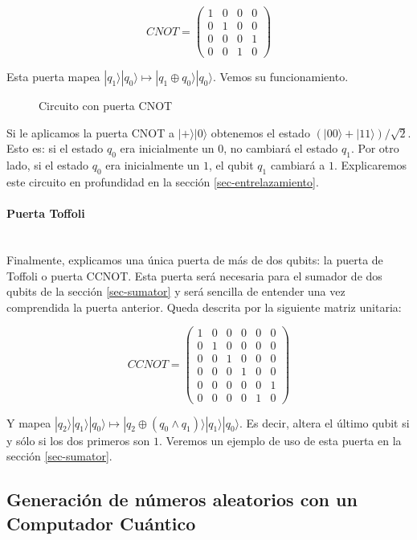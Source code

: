 \documentclass[11pt]{article}
\newcommand{\ra}{\rangle}
\newcommand{\myparagraph}[1]{\paragraph*{#1}\mbox{}\\}
\theoremstyle{plain}
\begin{document}
\[
	CNOT =
	\begin{pmatrix}
	1 & 0 & 0 & 0 \\
	0 & 1 & 0 & 0 \\
	0 & 0 & 0 & 1 \\
	0 & 0 & 1 & 0
	\end{pmatrix}
\]

Esta puerta mapea $|q_1\ra|q_0\ra \mapsto |q_1 \oplus q_0\ra|q_0\ra$. Vemos su funcionamiento.

\begin{figure}[H]
	\centering
	\caption{Circuito con puerta CNOT}
\end{figure}

Si le aplicamos la puerta CNOT a $|+\ra|0\ra$ obtenemos el estado $(|00\ra + |11\ra)/\sqrt 2$. Esto es: si el estado $q_0$ era inicialmente un $0$, no cambiará el estado $q_1$. Por otro lado, si el estado $q_0$ era inicialmente un $1$, el qubit $q_1$ cambiará a $1$. Explicaremos este circuito en profundidad en la sección \ref{sec-entrelazamiento}.


\myparagraph{Puerta Toffoli}


Finalmente, explicamos una única puerta de más de dos qubits: la puerta de Toffoli o puerta CCNOT. Esta puerta será necesaria para el sumador de dos qubits de la sección \ref{sec-sumator} y será sencilla de entender una vez comprendida la puerta anterior. Queda descrita por la siguiente matriz unitaria:

\[
	CCNOT =
	\begin{pmatrix}
	1 & 0 & 0 & 0 & 0 & 0 \\
	0 & 1 & 0 & 0 & 0 & 0 \\
	0 & 0 & 1 & 0 & 0 & 0 \\
	0 & 0 & 0 & 1 & 0 & 0 \\
	0 & 0 & 0 & 0 & 0 & 1 \\
	0 & 0 & 0 & 0 & 1 & 0
	\end{pmatrix}
\]

Y mapea $|q_2\ra|q_1\ra|q_0\ra \mapsto |q_2 \oplus (q_0 \wedge q_1)\ra|q_1\ra|q_0\ra$. Es decir, altera el último qubit si y sólo si los dos primeros son $1$. Veremos un ejemplo de uso de esta puerta en la sección \ref{sec-sumator}.


\subsection{Generación de números aleatorios con un Computador Cuántico}
\end{document}
